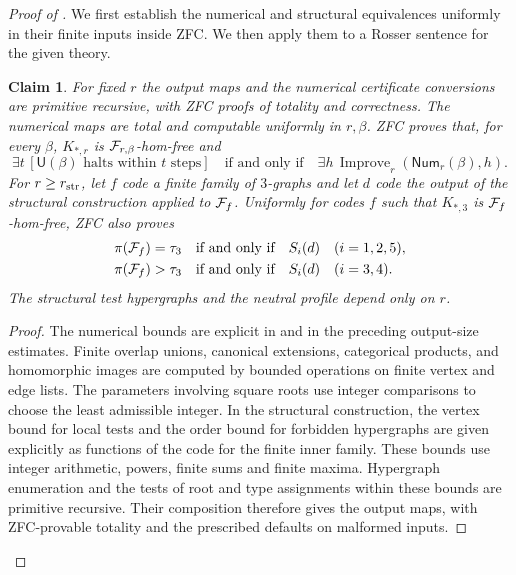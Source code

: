 \documentclass[10pt]{article}
\numberwithin{equation}{section}
\newtheorem{claim}[claim]{Claim}\aliascntresetthe{claim}
\theoremstyle{definition}
\newcommand{\Improve}{\operatorname{Improve}}
\begin{document}
\begin{proof}[Proof of ]
We first establish the numerical and structural equivalences uniformly in their finite inputs inside ZFC. We then apply them to a Rosser sentence for the given theory.

\begin{claim}
\label{prop:numericalbridge}\label{prop:structuralbridge}
For fixed $r$ the output maps and the numerical certificate conversions are primitive recursive, with ZFC proofs of totality and correctness. The numerical maps are total and computable uniformly in $r,\beta$. ZFC proves that, for every $\beta$, $K_{*,r}$ is $\mathcal F_{r,\beta}$-hom-free and
\begin{equation}\label{eq:internalnumerical}
 \exists t\,[\mathsf U(\beta)\text{ halts within }t\text{ steps}]\quad\text{if and only if}\quad
 \exists h\,\Improve_r(\mathsf{Num}_r(\beta),h).
\end{equation}
For $r\ge r_{\rm str}$, let $f$ code a finite family of $3$-graphs and let $d$ code the output of the structural construction applied to $\mathcal F_f$. Uniformly for codes $f$ such that $K_{*,3}$ is $\mathcal F_f$-hom-free, ZFC also proves
\begin{equation}\label{eq:internalstructural}
 \begin{aligned}
 \pi(\mathcal F_f)=\tau_3&\quad\text{if and only if}\quad S_i(d)\quad(i=1,2,5),\\
 \pi(\mathcal F_f)>\tau_3&\quad\text{if and only if}\quad S_i(d)\quad(i=3,4).
 \end{aligned}
\end{equation}
The structural test hypergraphs and the neutral profile depend only on $r$.
\end{claim}
\begin{proof}
The numerical bounds are explicit in  and in the preceding output-size estimates. Finite overlap unions, canonical extensions, categorical products, and homomorphic images are computed by bounded operations on finite vertex and edge lists. The parameters involving square roots use integer comparisons to choose the least admissible integer. In the structural construction, the vertex bound for local tests and the order bound for forbidden hypergraphs are given explicitly as functions of the code for the finite inner family. These bounds use integer arithmetic, powers, finite sums and finite maxima. Hypergraph enumeration and the tests of root and type assignments within these bounds are primitive recursive. Their composition therefore gives the output maps, with ZFC-provable totality and the prescribed defaults on malformed inputs.


\end{proof}
\end{proof}
\end{document}
